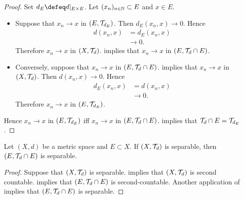 \documentclass{book}
\begin{document}
\begin{proof}Set $d_E \defeq d|_{E \times E}$. Let $(x_n)_{n \in \mathbb{N}} \subset E$ and $x \in E$.
	\begin{itemize}
		\item Suppose that $x_n \rightarrow x$ in $(E, \mathcal{T}_{d_E})$. Then $d_E(x_n, x) \rightarrow 0$. Hence  
		\begin{align*}
			d(x_n, x)
			& = d_E(x_n, x) \\
			& \rightarrow 0. 
		\end{align*}
		Therefore $x_n \rightarrow x$ in $(X, \mathcal{T}_d)$.  implies that $x_n \rightarrow x$ in $(E, \mathcal{T}_d \cap E)$. 
		\item Conversely, suppose that $x_n \rightarrow x$ in $(E, \mathcal{T}_d \cap E)$.  implies that $x_n \rightarrow x$ in $(X, \mathcal{T}_d)$. Then $d(x_n, x) \rightarrow 0$. Hence  
		\begin{align*}
			d_E(x_n, x)
			& = d(x_n, x) \\
			& \rightarrow 0. 
		\end{align*}
		Therefore $x_n \rightarrow x$ in $(E, \mathcal{T}_{d_E})$. 
	\end{itemize}
	Hence $x_n \rightarrow x$ in $(E, \mathcal{T}_{d_E})$ iff  $x_n \rightarrow x$ in $(E, \mathcal{T}_d \cap E)$.  implies that $\mathcal{T}_d \cap E = \mathcal{T}_{d_E}$.
\end{proof}


\begin{ex} 
	Let $(X, d)$ be a metric space and $E \subset X$. If $(X, \mathcal{T}_d)$ is separable, then $(E, \mathcal{T}_d \cap E)$ is separable.  
\end{ex}

\begin{proof}
	Suppose that $(X, \mathcal{T}_d)$ is separable.  implies that $(X, \mathcal{T}_d)$ is second countable.  implies that $(E, \mathcal{T}_d \cap E)$ is second-countable. Another application of  implies that $(E, \mathcal{T}_d \cap E)$ is separable. 
\end{proof}















\vspace{4cm}
\end{document}
